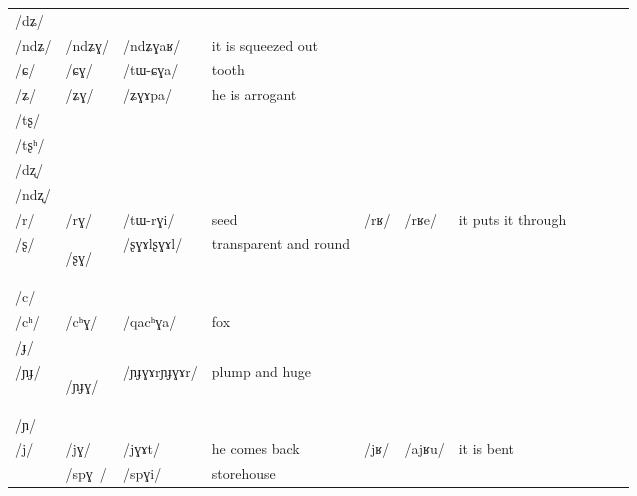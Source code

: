 \documentclass[oneside,a4paper,11pt]{article}
\newcommand{\ipa}[1]{\mbox{\phon/#1/}}
\newcommand{\deux}[1]{\ipa{#1}\addtocounter{2clusters}{1}}
\newcommand{\trois}[1]{\ipa{#1}\addtocounter{3clusters}{1}}
\newcommand{\idph}[1]{\cellcolor{gray}\textbf{#1}}
\begin{document}
\begin{table}
{\begin{tabular}{l|lll|lll|lll|l}
\ipa{dʑ}  	&    	&    	&  	&	&	& \\	
\ipa{ndʑ}  	&  \deux{ndʑɣ}  	&  \ipa{ndʑɣaʁ}  	&  it is squeezed out	&	&	& \\	
\ipa{ɕ}  	&  \deux{ɕɣ}  	&  \ipa{tɯ-ɕɣa}  	&  tooth	&	&	& \\	
\ipa{ʑ}  	&  \deux{ʑɣ}  	&  \ipa{ʑɣɤpa}  	& he is arrogant 	&	&	& \\	
\ipa{tʂ}  	&    	&    	&  	&	&	& \\	
\ipa{tʂʰ}  	&    	&    	&  	&	&	& \\	
\ipa{dʐ}  	&    	&    	&  	&	&	& \\	
\ipa{ndʐ}  	&    	&    	&  	&	&	& \\	
\ipa{r}  	&  \deux{rɣ}  	&  \ipa{tɯ-rɣi}  	&  seed	&\deux{rʁ}	&\ipa{rʁe}	& it puts it through\\	
\ipa{ʂ}  	&  \deux{ʂɣ} \idph{} 	&  \ipa{ʂɣɤlʂɣɤl}  	& transparent and round	&	&	& \\	
\ipa{c}  	&    	&    	&  	&	&	& \\	
\ipa{cʰ}  	&  \deux{cʰɣ}  	&  \ipa{qacʰɣa}  	&fox  	&	&	& \\	
\ipa{ɟ}  	&    	&    	&  	&	&	& \\	
\ipa{ɲɟ}  	&  \deux{ɲɟɣ} \idph{} 	&  \ipa{ɲɟɣɤrɲɟɣɤr}  	&   plump and huge	&	&	& \\	
\ipa{ɲ}  	&    	&    	&  	&	&	& \\	
\ipa{j}  	&  \deux{jɣ}  	&  \ipa{jɣɤt}  	&he comes back  	&\deux{jʁ}	&\ipa{ajʁu}	&it is bent \\	
\midrule						
	&\trois{spɣ }  	&\ipa{spɣi}  	&storehouse	&	&	&\\

\end{tabular}}
\end{table}
\end{document}
